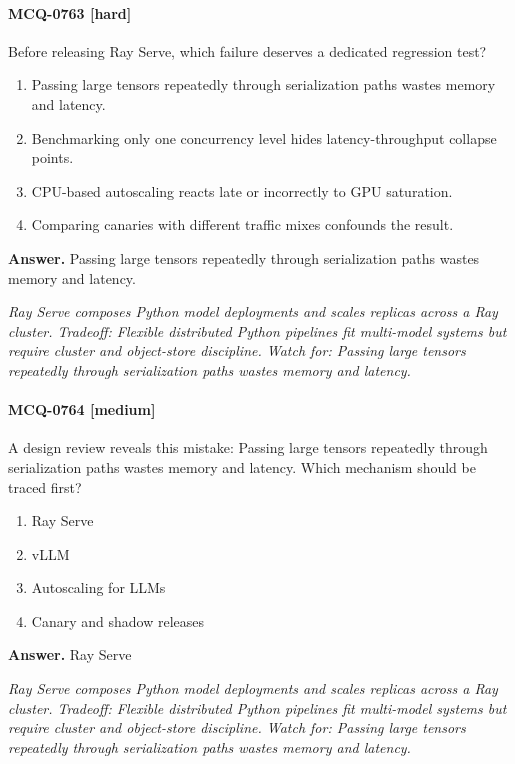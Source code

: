 \paragraph{MCQ-0763 [hard]} Before releasing Ray Serve, which failure deserves a dedicated regression test?
\begin{enumerate}[label=\Alph*.]
\item Passing large tensors repeatedly through serialization paths wastes memory and latency.
\item Benchmarking only one concurrency level hides latency-throughput collapse points.
\item CPU-based autoscaling reacts late or incorrectly to GPU saturation.
\item Comparing canaries with different traffic mixes confounds the result.
\end{enumerate}
\noindent\textbf{Answer.} Passing large tensors repeatedly through serialization paths wastes memory and latency.
\par\textit{Ray Serve composes Python model deployments and scales replicas across a Ray cluster. Tradeoff: Flexible distributed Python pipelines fit multi-model systems but require cluster and object-store discipline. Watch for: Passing large tensors repeatedly through serialization paths wastes memory and latency.}
\paragraph{MCQ-0764 [medium]} A design review reveals this mistake: Passing large tensors repeatedly through serialization paths wastes memory and latency. Which mechanism should be traced first?
\begin{enumerate}[label=\Alph*.]
\item Ray Serve
\item vLLM
\item Autoscaling for LLMs
\item Canary and shadow releases
\end{enumerate}
\noindent\textbf{Answer.} Ray Serve
\par\textit{Ray Serve composes Python model deployments and scales replicas across a Ray cluster. Tradeoff: Flexible distributed Python pipelines fit multi-model systems but require cluster and object-store discipline. Watch for: Passing large tensors repeatedly through serialization paths wastes memory and latency.}
